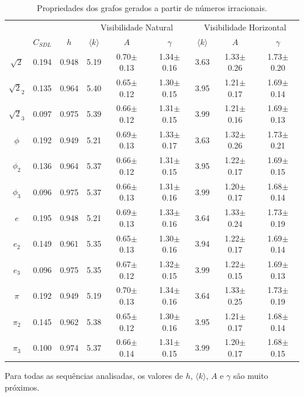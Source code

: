 \documentclass[12pt,a4paper,fleqn]{report}
\begin{document}
\begin{table}[H]
    \small
    \centering
    \caption{ Propriedades dos grafos gerados a partir de números irracionais.}
    \begin{tabular}{|c|cc|ccc|ccc|}
    \hline
 &&& \multicolumn{3}{|c|}{Visibilidade Natural} & \multicolumn{3}{|c|}{Visibilidade Horizontal} \\
& $C_{SDL}$ & $h$ & $\langle k \rangle$ & $A$ & $\gamma$  & $\langle k \rangle$ & $A$ & $\gamma$ \\
\hline 
 $\sqrt{2}$     & 0.194 & 0.948 & 5.19 & 0.70$\pm$0.13 & 1.34$\pm$0.16 & 3.63 & 1.33$\pm$0.26 & 1.73$\pm$0.20 \\
 $\sqrt{2}_2$   & 0.135 & 0.964 & 5.40 & 0.65$\pm$0.12 & 1.30$\pm$0.15 & 3.95 & 1.21$\pm$0.17 & 1.69$\pm$0.14 \\
 $\sqrt{2}_3$   & 0.097 & 0.975 & 5.39 & 0.66$\pm$0.12 & 1.31$\pm$0.15 & 3.99 & 1.21$\pm$0.16 & 1.69$\pm$0.13 \\
 $\phi$         & 0.192 & 0.949 & 5.21 & 0.69$\pm$0.13 & 1.33$\pm$0.17 & 3.63 & 1.32$\pm$0.26 & 1.73$\pm$0.21 \\
 $\phi_2$       & 0.136 & 0.964 & 5.37 & 0.66$\pm$0.12 & 1.31$\pm$0.15 & 3.95 & 1.22$\pm$0.17 & 1.69$\pm$0.15 \\
 $\phi_3$       & 0.096 & 0.975 & 5.37 & 0.66$\pm$0.13 & 1.31$\pm$0.16 & 3.99 & 1.20$\pm$0.17 & 1.68$\pm$0.14 \\
 $e$            & 0.195 & 0.948 & 5.21 & 0.69$\pm$0.13 & 1.33$\pm$0.16 & 3.64 & 1.33$\pm$0.24 & 1.73$\pm$0.19 \\
 $e_2$          & 0.149 & 0.961 & 5.35 & 0.65$\pm$0.13 & 1.30$\pm$0.16 & 3.94 & 1.22$\pm$0.17 & 1.69$\pm$0.14 \\
 $e_3$          & 0.096 & 0.975 & 5.35 & 0.67$\pm$0.12 & 1.32$\pm$0.15 & 3.99 & 1.22$\pm$0.15 & 1.69$\pm$0.13 \\
 $\pi$          & 0.192 & 0.949 & 5.19 & 0.70$\pm$0.13 & 1.34$\pm$0.16 & 3.64 & 1.33$\pm$0.25 & 1.73$\pm$0.19 \\
 $\pi_2$        & 0.145 & 0.962 & 5.38 & 0.65$\pm$0.12 & 1.30$\pm$0.16 & 3.95 & 1.21$\pm$0.17 & 1.68$\pm$0.14 \\
 $\pi_3$        & 0.100 & 0.974 & 5.37 & 0.66$\pm$0.14 & 1.31$\pm$0.15 & 3.99 & 1.20$\pm$0.17 & 1.68$\pm$0.15 \\
 \hline
\end{tabular}
    \label{tab:numbers}
\end{table}

Para todas as sequências analisadas, os valores de $h$, $\langle k\rangle$, $A$ e $\gamma$ são muito próximos.
\end{document}
